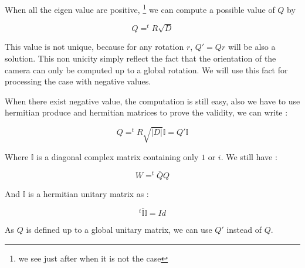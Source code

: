 When all the eigen value are positive, 
\footnote{we see just after when it is not the case}
we can compute a possible value of $Q$ by 

\begin{equation}
    Q  =  ^t R  \sqrt{D}
\end{equation}

This value is not unique, because for any rotation $r$, $Q' = Qr$ will be also a solution. This
non unicity simply reflect the fact that the orientation of the camera can only be computed
up to a global rotation. We will use this fact for processing the case with negative values.

When there exist negative value, the computation is still easy, also we have to use hermitian produce
and hermitian matrices to prove the validity, we can write : 

\begin{equation}
    Q  =  ^t R  \sqrt{|D|} \mathbb{I} = Q' \mathbb{I} 
\end{equation}

Where $\mathbb{I}$  is a diagonal complex matrix containing only $1$ or $i$. We still have :

\begin{equation}
    W= ^t \overline{Q}  Q
\end{equation}

And $\mathbb{I}$ is a hermitian unitary matrix as : 

\begin{equation}
     ^t  \overline{\mathbb{I}}  \mathbb{I} = Id
\end{equation}


As $Q$ is defined up to a global unitary matrix, we can use $Q'$ instead of $Q$.




